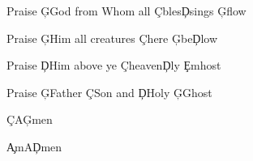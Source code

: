 \documentclass[9pt]{extarticle}
\begin{document}
\bsong

\bc
Praise \c{G}God from Whom all \c{C}bles\c{D}sings \c{G}flow

Praise \c{G}Him all creatures \c{C}here \c{G}be\c{D}low

Praise \c{D}Him above ye \c{C}heaven\c{D}ly \c{Em}host

Praise \c{G}Father \c{C}Son and \c{D}Holy \c{G}Ghost
\ec

\bb
\c{C}A\c{G}men
\eb

\bb
\c{Am}A\c{D}men
\eb

\esong
\end{document}
